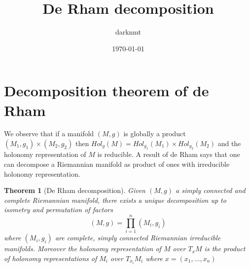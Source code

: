 \documentclass[11pt]{article}
\author{darknmt}
\date{\today}
\title{De Rham decomposition}
\newtheorem{theorem}{Theorem}
\begin{document}
\maketitle
\tableofcontents


\section{Decomposition theorem of de Rham}
\label{sec:orgdd21078}

We observe that if a manifold \((M,g)\) is globally a product \((M_1,g_1)\times (M_2,g_2)\) then
\(Hol_{g}(M) = Hol_{g_1}(M_1)\times Hol_{g_2}(M_2)\) and the holonomy representation of \(M\) is
reducible. A result of de Rham says that one can decompose a Riemannian manifold as product of ones
with irreducible holonomy representation.


\begin{theorem}[De Rham decomposition]
\label{orgb528e55}
Given \((M,g)\) a simply connected and complete Riemannian manifold, there exists a unique
decomposition up to isometry and permutation of factors
\[
(M,g) = \prod_{i=1}^n(M_i,g_i)
\]
where \((M_i,g_i)\) are complete, simply connected Riemannian irreducible manifolds. Moreover the
holonomy representation of \(M\) over \(T_xM\) is the product of holonomy representations of \(M_i\) over
\(T_{x_i}M_i\) where \(x = (x_1,\dots, x_n)\)
\end{theorem}
\end{document}
